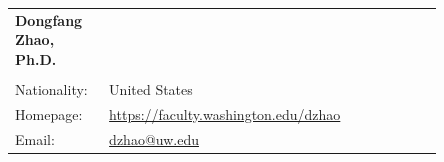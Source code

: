 \documentclass[11pt,]{scrartcl}
\date{}
\newcommand{\arygap}{.9}
\begin{document}
\begin{table}[h]
{\def\arraystretch{\arygap}\tabcolsep=0pt
\begin{tabular}{p{0.15\linewidth}p{0.7\linewidth}}

  \multirow{1}{*}{\LARGE \textbf{Dongfang Zhao, Ph.D.}} & \\
  & \\
  
  Nationality: & United States\\
  Homepage: & \href{https://faculty.washington.edu/dzhao}{https://faculty.washington.edu/dzhao} \\
  Email: & \href{mailto:dzhao@uw.edu}{dzhao@uw.edu} \\
  
  
  
  

\end{tabular}%
}
\end{table}
\end{document}
